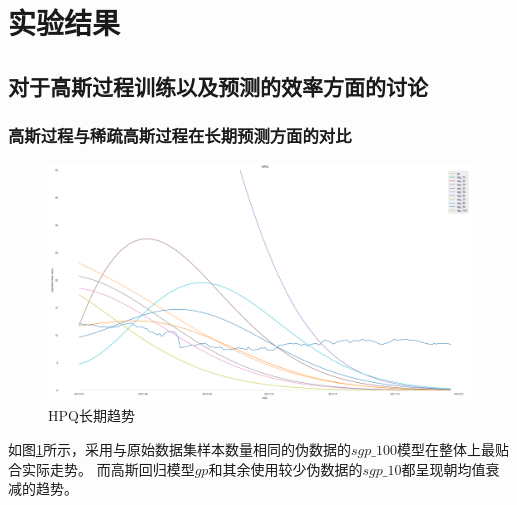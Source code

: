 \section{实验结果}
\subsection{对于高斯过程训练以及预测的效率方面的讨论}

\subsubsection{高斯过程与稀疏高斯过程在长期预测方面的对比}

\begin{figure}[!htbp]
    \centering
    \includegraphics[width=\textwidth]{images/lab1/HPQ_trend.png}
    \caption{HPQ长期趋势}\label{1lab1HPQtrend}
\end{figure}

如图\ref{1lab1HPQtrend}所示，采用与原始数据集样本数量相同的伪数据的$sgp\_100$模型在整体上最贴合实际走势。
而高斯回归模型$gp$和其余使用较少伪数据的$sgp\_10$都呈现朝均值衰减的趋势。


